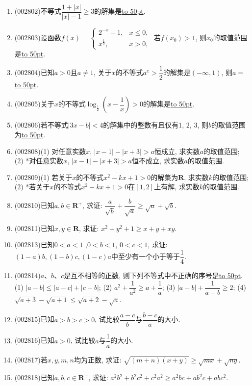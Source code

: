 \documentclass[10pt,a4paper]{article}
\newcommand{\blank}[1]{\underline{\hbox to #1pt{}}}
\begin{document}
\begin{enumerate}[1.]

\item {\tiny (002802)}不等式$\dfrac{1+|x|}{|x|-1}\ge 3$的解集是\blank{50}.
\item {\tiny (002803)}设函数$f(x)=\begin{cases} 2^{-x}-1, & x\le 0, \\ x^{\frac 12}, & x>0, \end{cases}$ 若$f(x_0)>1$, 则$x_0$的取值范围是\blank{50}.
\item {\tiny (002804)}已知$a>0$且$a\ne 1$, 关于$x$的不等式$a^x>\dfrac 12$的解集是$(-\infty ,1)$, 则$a=$\blank{50}.
\item {\tiny (002805)}关于$x$的不等式$\log_{\frac 12}(x-\dfrac 1x)>0$的解集是\blank{50}.
\item {\tiny (002806)}若不等式$|3x-b|<4$的解集中的整数有且仅有$1$, $2$, $3$, 则$b$的取值范围为\blank{50}.
\item {\tiny (002808)}(1) 对任意实数$x$, $|x-1|-|x+3|>a$恒成立, 求实数$a$的取值范围;\\
(2) *对任意实数$x$, $|x-1|-|x+3|>a$恒不成立, 求实数$a$的取值范围.
\item {\tiny (002809)}(1) 若关于$x$的不等式$x^2-kx+1>0$的解集为$\mathbf{R}$, 求实数$k$的取值范围;\\
(2) *若关于$x$的不等式$x^2-kx+1>0$在$[1,2]$上有解, 求实数$k$的取值范围.
\item {\tiny (002810)}已知$a,b\in \mathbf{R}^+$, 求证: $\dfrac a{\sqrt b}+\dfrac b{\sqrt a}\ge \sqrt a+\sqrt b$.
\item {\tiny (002811)}已知$x,y\in \mathbf{R}$, 求证: $x^2+y^2+1\ge x+y+xy$.
\item {\tiny (002813)}已知$0<a<1$ ,$0<b<1$, $0<c<1$, 求证: $(1-a)b,(1-b)c,(1-c)a$中至少有一个小于等于$\dfrac 14$.
\item {\tiny (002814)}$a$、$b$、$c$是互不相等的正数, 则下列不等式中不正确的序号是\blank{50}.\\
(1) $|a-b|\le |a-c|+|c-b|$; (2) ${a^2}+\dfrac 1{a^2}\ge a+\dfrac 1a$; (3) $|a-b|+\dfrac 1{a-b}\ge 2$; (4) $\sqrt{a+3}-\sqrt{a+1}\le \sqrt{a+2}-\sqrt a$.
\item {\tiny (002815)}已知$a>b>c>0$, 试比较$\dfrac{a-c}b$与$\dfrac{b-c}a$的大小.
\item {\tiny (002816)}已知$a>0$, 试比较$a$与$\dfrac 1a$的大小.
\item {\tiny (002817)}若$x,y,m,n$均为正数, 求证: $\sqrt{(m+n)(x+y)}\ge \sqrt{mx}+\sqrt{ny}$.
\item {\tiny (002818)}已知$a,b,c\in \mathbf{R}^+$, 求证: $a^2b^2+b^2c^2+c^2a^2\ge a^2bc+ab^2c+abc^2$.

\end{enumerate}
\end{document}
